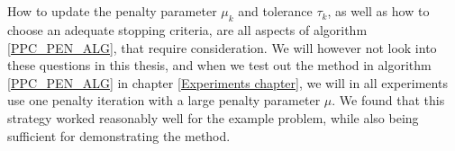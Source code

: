 \\
\\
How to update the penalty parameter $\mu_k$ and tolerance $\tau_k$, as well as how to choose an adequate stopping criteria, are all aspects of algorithm \ref{PPC_PEN_ALG}, that require consideration. We will however not look into these questions in this thesis, and when we test out the method in algorithm \ref{PPC_PEN_ALG} in chapter \ref{Experiments chapter}, we will in all experiments use one penalty iteration with a large penalty parameter $\mu$. We found that this strategy worked reasonably well for the example problem, while also being sufficient for demonstrating the method.
